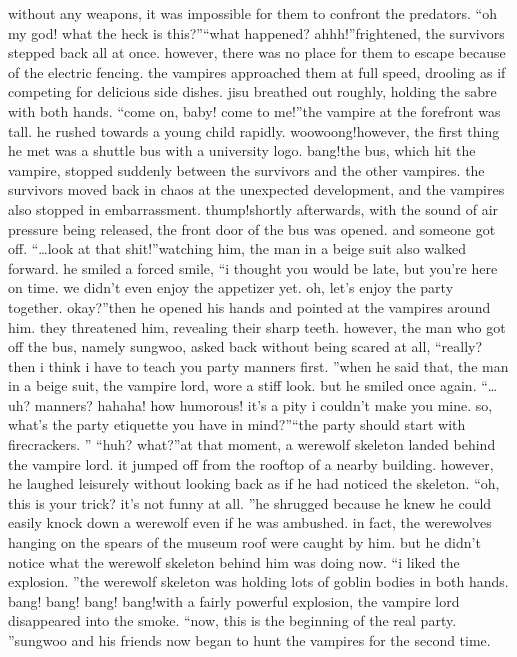 without any weapons, it was impossible for them to confront the predators.
“oh my god! what the heck is this?”“what happened? ahhh!”frightened, the survivors stepped back all at once.
 however, there was no place for them to escape because of the electric fencing.
 the vampires approached them at full speed, drooling as if competing for delicious side dishes.
 jisu breathed out roughly, holding the sabre with both hands.
“come on, baby! come to me!”the vampire at the forefront was tall.
 he rushed towards a young child rapidly.
woowoong!however, the first thing he met was a shuttle bus with a university logo.
bang!the bus, which hit the vampire, stopped suddenly between the survivors and the other vampires.
 the survivors moved back in chaos at the unexpected development, and the vampires also stopped in embarrassment.
thump!shortly afterwards, with the sound of air pressure being released, the front door of the bus was opened.
 and someone got off.
“…look at that shit!”watching him, the man in a beige suit also walked forward.
he smiled a forced smile, “i thought you would be late, but you’re here on time.
 we didn’t even enjoy the appetizer yet.
 oh, let’s enjoy the party together.
 okay?”then he opened his hands and pointed at the vampires around him.
they threatened him, revealing their sharp teeth.
 however, the man who got off the bus, namely sungwoo, asked back without being scared at all, “really? then i think i have to teach you party manners first.
”when he said that, the man in a beige suit, the vampire lord, wore a stiff look.
 but he smiled once again.
“…uh? manners? hahaha! how humorous! it’s a pity i couldn’t make you mine.
 so, what’s the party etiquette you have in mind?”“the party should start with firecrackers.
”
“huh? what?”at that moment, a werewolf skeleton landed behind the vampire lord.
 it jumped off from the rooftop of a nearby building.
 however, he laughed leisurely without looking back as if he had noticed the skeleton.
“oh, this is your trick? it’s not funny at all.
”he shrugged because he knew he could easily knock down a werewolf even if he was ambushed.
 in fact, the werewolves hanging on the spears of the museum roof were caught by him.
 but he didn’t notice what the werewolf skeleton behind him was doing now.
“i liked the explosion.
”the werewolf skeleton was holding lots of goblin bodies in both hands.
bang! bang! bang! bang!with a fairly powerful explosion, the vampire lord disappeared into the smoke.
“now, this is the beginning of the real party.
”sungwoo and his friends now began to hunt the vampires for the second time.
